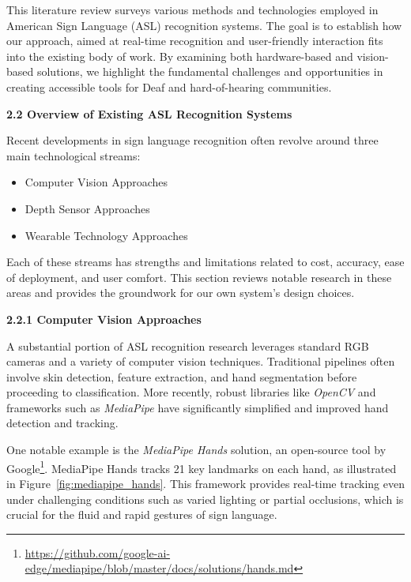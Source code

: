 \documentclass[12pt]{article}
\begin{document}
This literature review surveys various methods and technologies employed in American 
Sign Language (ASL) recognition systems. The goal is to establish how our approach, aimed 
at real-time recognition and user-friendly interaction fits into the existing body of work.
By examining both hardware-based and vision-based solutions, we highlight the fundamental 
challenges and opportunities in creating accessible tools for Deaf and hard-of-hearing 
communities.

\vspace{1.5em}
\noindent
\textbf{2.2 Overview of Existing ASL Recognition Systems}
\vspace{1em}

Recent developments in sign language recognition often revolve around three main 
technological streams:

\begin{itemize}
    \item Computer Vision Approaches
    \item Depth Sensor Approaches
    \item Wearable Technology Approaches
\end{itemize}

Each of these streams has strengths and limitations related to cost, accuracy, ease of 
deployment, and user comfort. This section reviews notable research in these areas and 
provides the groundwork for our own system’s design choices.

\vspace{1.0em}
\noindent
\textbf{2.2.1 Computer Vision Approaches}
\vspace{0.5em}

A substantial portion of ASL recognition research leverages standard RGB cameras and 
a variety of computer vision techniques. Traditional pipelines often involve skin detection, 
feature extraction, and hand segmentation before proceeding to classification. More recently, 
robust libraries like \textit{OpenCV} and frameworks such as \textit{MediaPipe} have significantly simplified 
and improved hand detection and tracking.

One notable example is the \textit{MediaPipe Hands} solution, an open-source tool by Google\footnote{\url{https://github.com/google-ai-edge/mediapipe/blob/master/docs/solutions/hands.md}}. 
MediaPipe Hands tracks 21 key landmarks on each hand, as illustrated in Figure~\ref{fig:mediapipe_hands}. This 
framework provides real-time tracking even under challenging conditions such as varied lighting 
or partial occlusions, which is crucial for the fluid and rapid gestures of sign language.
\end{document}
